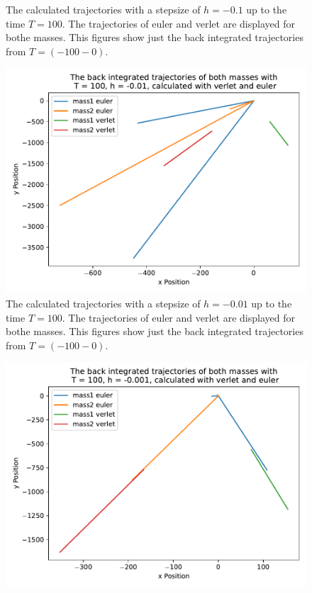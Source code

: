 \begin{itemize}
\begin{figure}
        \caption{The calculated trajectories with a stepsize of $h=-0.1$ up to the time $T=100$.
        The trajectories of euler and verlet are displayed for bothe masses.
        This figures show just the back integrated trajectories from $T=(-100 - 0)$.}
        \label{fig:h_01_100}
    \end{figure}
    \begin{figure}
        \centering
        \includegraphics[width=\textwidth]{plots/plotsT_100_h_001/plotd.pdf}
        \caption{The calculated trajectories with a stepsize of $h=-0.01$ up to the time $T=100$.
        The trajectories of euler and verlet are displayed for bothe masses.
        This figures show just the back integrated trajectories from $T=(-100 - 0)$.}
        \label{}
    \end{figure}
    \begin{figure}
        \centering
        \includegraphics[width=\textwidth]{plots/plotsT_100_h_0001/plotd.pdf}

\end{figure}
\end{itemize}
